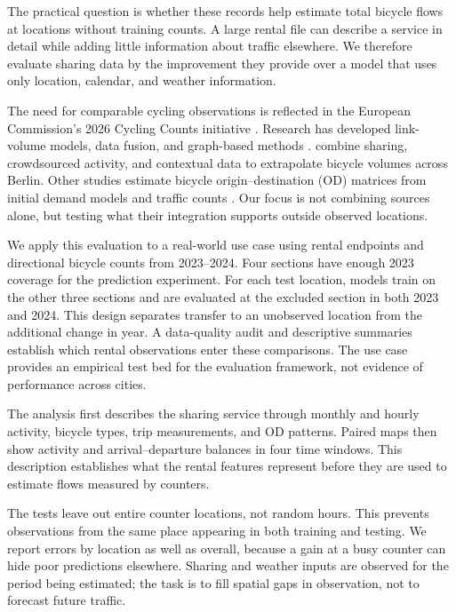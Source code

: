\documentclass{interact}
\begin{document}
The practical question is whether these records help estimate total bicycle flows at locations without training counts. A large rental file can describe a service in detail while adding little information about traffic elsewhere. We therefore evaluate sharing data by the improvement they provide over a model that uses only location, calendar, and weather information.

The need for comparable cycling observations is reflected in the European Commission's 2026 Cycling Counts initiative \citep{cyclingCounts2026}. Research has developed link-volume models, data fusion, and graph-based methods \citep{bhowmick2023,kothuri2022,gupta2025}. \citet{kaiser2025} combine sharing, crowdsourced activity, and contextual data to extrapolate bicycle volumes across Berlin. Other studies estimate bicycle origin--destination (OD) matrices from initial demand models and traffic counts \citep{ryu2020,melo2023}. Our focus is not combining sources alone, but testing what their integration supports outside observed locations.

We apply this evaluation to a real-world use case using rental endpoints and directional bicycle counts from 2023--2024. Four sections have enough 2023 coverage for the prediction experiment. For each test location, models train on the other three sections and are evaluated at the excluded section in both 2023 and 2024. This design separates transfer to an unobserved location from the additional change in year. A data-quality audit and descriptive summaries establish which rental observations enter these comparisons. The use case provides an empirical test bed for the evaluation framework, not evidence of performance across cities.

The analysis first describes the sharing service through monthly and hourly activity, bicycle types, trip measurements, and OD patterns. Paired maps then show activity and arrival--departure balances in four time windows. This description establishes what the rental features represent before they are used to estimate flows measured by counters.

The tests leave out entire counter locations, not random hours. This prevents observations from the same place appearing in both training and testing. We report errors by location as well as overall, because a gain at a busy counter can hide poor predictions elsewhere. Sharing and weather inputs are observed for the period being estimated; the task is to fill spatial gaps in observation, not to forecast future traffic.
\end{document}
